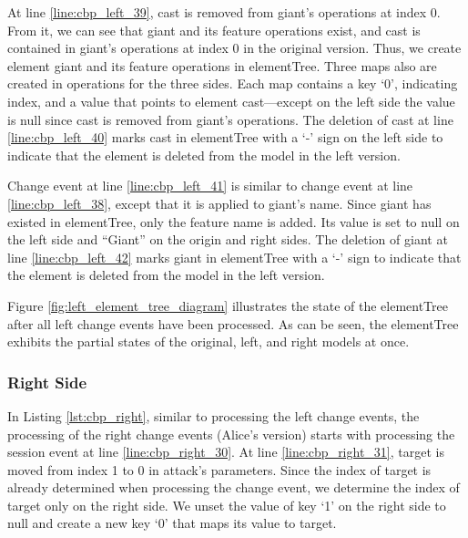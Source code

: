 At line \ref{line:cbp_left_39}, \textsf{cast} is removed from \textsf{giant}’s \textsf{operations} at index 0. From it, we can see that \textsf{giant} and its feature \textsf{operations} exist, and \textsf{cast} is contained in \textsf{giant}’s \textsf{operations} at index 0 in the original version. Thus, we create element \textsf{giant} and its feature \textsf{operations} in \textsf{elementTree}. Three maps also are created in \textsf{operations} for the three sides. Each map contains a key ‘0’, indicating index, and a value that points to element \textsf{cast}—except on the left side the value is null since \textsf{cast} is removed from \textsf{giant}’s \textsf{operations}. The deletion of \textsf{cast} at line \ref{line:cbp_left_40} marks \textsf{cast} in \textsf{elementTree} with a ‘-’ sign on the left side to indicate that the element is deleted from the model in the left version.

Change event at line \ref{line:cbp_left_41} is similar to change event at line \ref{line:cbp_left_38}, except that it is applied to \textsf{giant}’s \textsf{name}. Since \textsf{giant} has existed in \textsf{elementTree}, only the feature \textsf{name} is added. Its value is set to null on the left side and “Giant” on the origin and right sides. The deletion of \textsf{giant} at line \ref{line:cbp_left_42} marks \textsf{giant} in \textsf{elementTree} with a ‘-’ sign to indicate that the element is deleted from the model in the left version.

Figure \ref{fig:left_element_tree_diagram} illustrates the state of the \textsf{elementTree} after all left change events have been processed. As can be seen, the \textsf{elementTree} exhibits the partial states of the original, left, and right models at once.

\subsubsection{Right Side}\label{sec:right_side}
In Listing \ref{lst:cbp_right}, similar to processing the left change events, the processing of the right change events (Alice’s version) starts with processing the session event at line \ref{line:cbp_right_30}. At line \ref{line:cbp_right_31}, \textsf{target} is moved from index 1 to 0 in \textsf{attack}’s \textsf{parameters}. Since the index of \textsf{target} is already determined when processing the change event, we determine the index of \textsf{target} only on the right side. We unset the value of key ‘1’ on the right side to null and create a new key ‘0’ that maps its value to \textsf{target}.

